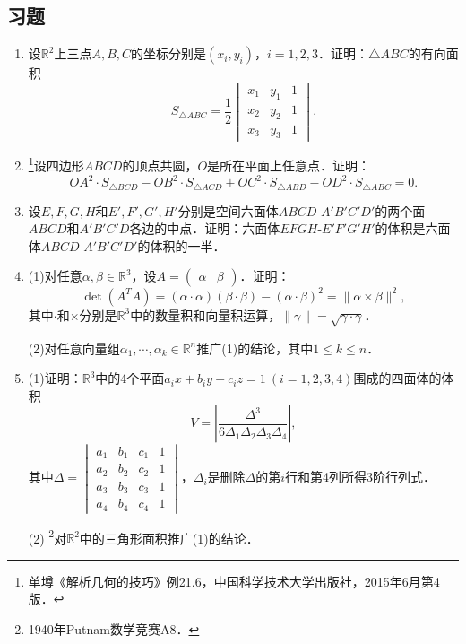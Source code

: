 \documentclass[a4paper,fontset=windows]{ctexbook}
\theoremstyle{definition}
\renewcommand{\le}{\leqslant}
\begin{document}
\subsection*{习题}

\begin{enumerate}
\item 设$\mathbb{R}^2$上三点$A,B,C$的坐标分别是$(x_i,y_i)$，$i=1,2,3$．证明：$\triangle ABC$的有向面积
$$S_{\triangle ABC}=\frac{1}{2}\begin{vmatrix}x_1&y_1&1 \\ x_2&y_2&1 \\ x_3&y_3&1\end{vmatrix}.$$

\item \footnote{单墫《解析几何的技巧》例21.6，中国科学技术大学出版社，2015年6月第4版．}设四边形$ABCD$的顶点共圆，$O$是所在平面上任意点．证明：
$$OA^2\cdot S_{\triangle BCD}-OB^2\cdot S_{\triangle ACD}+OC^2\cdot S_{\triangle ABD}-OD^2\cdot S_{\triangle ABC}=0.$$

\item 设$E,F,G,H$和$E',F',G',H'$分别是空间六面体$ABCD$-$A'B'C'D'$的两个面$ABCD$和$A'B'C'D$各边的中点．证明：六面体$EFGH$-$E'F'G'H'$的体积是六面体$ABCD$-$A'B'C'D'$的体积的一半．

\item (1)对任意$\alpha,\beta\in\mathbb{R}^3$，设$A=\begin{pmatrix}\alpha&\beta\end{pmatrix}$．证明：
$$\det(A^TA)=(\alpha\cdot\alpha)(\beta\cdot\beta)-(\alpha\cdot\beta)^2=\|\alpha\times\beta\|^2,$$
其中$\cdot$和$\times$分别是$\mathbb{R}^3$中的数量积和向量积运算，$\|\gamma\|=\sqrt{\gamma\cdot\gamma}$．

(2)对任意向量组$\alpha_1,\cdots,\alpha_k\in\mathbb{R}^n$推广(1)的结论，其中$1\le k\le n$．

\item (1)证明：$\mathbb{R}^3$中的4个平面$a_ix+b_iy+c_iz=1~(i=1,2,3,4)$围成的四面体的体积
$$V=\left|\frac{\Delta^3}{6\Delta_1\Delta_2\Delta_3\Delta_4}\right|,$$
其中$\Delta=\begin{vmatrix}a_1&b_1&c_1&1 \\ a_2&b_2&c_2&1 \\ a_3&b_3&c_3&1 \\ a_4&b_4&c_4&1\end{vmatrix}$，$\Delta_i$是删除$\Delta$的第$i$行和第4列所得3阶行列式．

(2) \footnote{1940年Putnam数学竞赛A8．}对$\mathbb{R}^2$中的三角形面积推广(1)的结论．


\end{enumerate}
\end{document}
